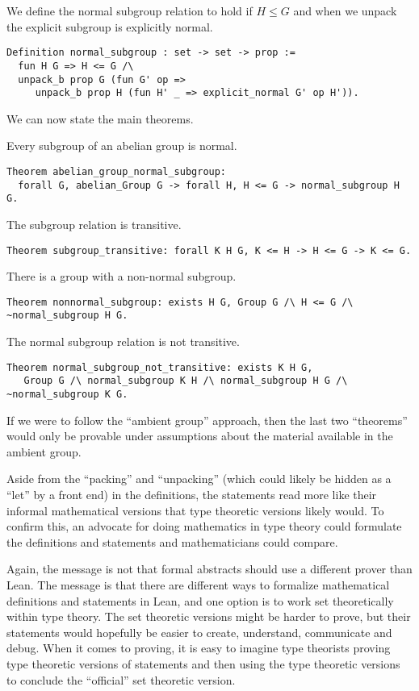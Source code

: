 \documentclass{article}
\begin{document}
We define the normal subgroup relation to hold if $H\leq G$ and when we unpack the explicit subgroup is
explicitly normal.
\begin{verbatim}
Definition normal_subgroup : set -> set -> prop :=
  fun H G => H <= G /\
  unpack_b prop G (fun G' op =>
     unpack_b prop H (fun H' _ => explicit_normal G' op H')).
\end{verbatim}

We can now state the main theorems.

Every subgroup of an abelian group is normal.
\begin{verbatim}
Theorem abelian_group_normal_subgroup:
  forall G, abelian_Group G -> forall H, H <= G -> normal_subgroup H G.
\end{verbatim}

The subgroup relation is transitive.
\begin{verbatim}
Theorem subgroup_transitive: forall K H G, K <= H -> H <= G -> K <= G.
\end{verbatim}

There is a group with a non-normal subgroup.
\begin{verbatim}
Theorem nonnormal_subgroup: exists H G, Group G /\ H <= G /\ ~normal_subgroup H G.
\end{verbatim}

The normal subgroup relation is not transitive.
\begin{verbatim}
Theorem normal_subgroup_not_transitive: exists K H G,
   Group G /\ normal_subgroup K H /\ normal_subgroup H G /\ ~normal_subgroup K G.
\end{verbatim}

If we were to follow the ``ambient group'' approach, then the last two ``theorems'' would only
be provable under assumptions about the material available in the ambient group.

Aside from the ``packing'' and ``unpacking'' (which could likely be hidden as a ``let'' by a front end)
in the definitions, the statements read more like their informal mathematical versions
that type theoretic versions likely would. To confirm this, an advocate for doing
mathematics in type theory could formulate the definitions and statements
and mathematicians could compare.

Again, the message is not that formal abstracts should use a different prover than Lean.
The message is that there are different ways to formalize mathematical definitions and statements
in Lean, and one option is to work set theoretically within type theory.
The set theoretic versions might be harder to prove, but their statements would hopefully
be easier to create, understand, communicate and debug.
When it comes to proving, it is easy to imagine type theorists proving type theoretic versions
of statements and then using the type theoretic versions to conclude the ``official'' set theoretic version.




\end{document}
